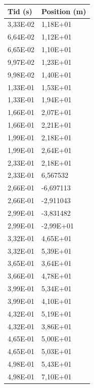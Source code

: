 \documentclass[11p, titlepage, oneside, a4paper]{article}
\begin{document}
        \begin{table}
            \centering
            \begin{tabular}{ll}
                \toprule
                \textbf{Tid (s)} & \textbf{Position (m)} \\
                \midrule
                3,33E-02 & 1,18E+01 \\
                6,64E-02 & 1,12E+01 \\
                6,65E-02 & 1,10E+01 \\
                9,97E-02 & 1,23E+01 \\
                9,98E-02 & 1,40E+01 \\
                1,33E-01 & 1,53E+01 \\
                1,33E-01 & 1,94E+01 \\
                1,66E-01 & 2,07E+01 \\
                1,66E-01 & 2,21E+01 \\
                1,99E-01 & 2,18E+01 \\
                1,99E-01 & 2,64E+01 \\
                2,33E-01 & 2,18E+01 \\
                2,33E-01 & 6,567532 \\
                2,66E-01 & -6,697113 \\
                2,66E-01 & -2,911043 \\
                2,99E-01 & -3,831482 \\
                2,99E-01 & -2,99E+01 \\
                3,32E-01 & 4,65E+01 \\
                3,32E-01 & 5,39E+01 \\
                3,65E-01 & 3,64E+01 \\
                3,66E-01 & 4,78E+01 \\
                3,99E-01 & 5,34E+01 \\
                3,99E-01 & 4,10E+01 \\
                4,32E-01 & 5,19E+01 \\
                4,32E-01 & 3,86E+01 \\
                4,65E-01 & 5,00E+01 \\
                4,65E-01 & 5,03E+01 \\
                4,98E-01 & 5,43E+01 \\
                4,98E-01 & 7,10E+01 \\

\end{tabular}
\end{table}
\end{document}
